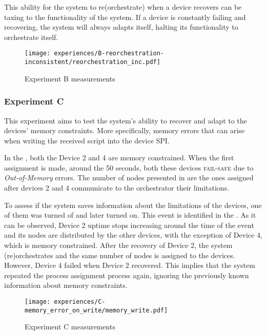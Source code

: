 This ability for the system to re(orchestrate) when a device recovers can be taxing to the functionality of the system. If a device is constantly failing and recovering, the system will always adapts itself, halting its functionality to orchestrate itself.

\begin{figure}[h]
\centering
\texttt{[image: experiences/B-reorchestration-inconsistent/reorchestration\_inc.pdf]}
\caption[Experiment B measurements]{Experiment B measurements}\label{fig:experiment_b_graph}
\end{figure}


\subsubsection{Experiment C}

This experiment aims to test the system's ability to recover and adapt to the devices' memory constraints. More specifically, memory errors that can arise when writing the received script into the device SPI.

In the , both the Device 2 and 4 are memory constrained. When the first assignment is made, around the 50 seconds, both these devices \textsc{fail-safe} due to \textit{Out-of-Memory} errors. The number of nodes presented in  are the ones assigned after devices 2 and 4 communicate to the orchestrator their limitations. 

To assess if the system saves information about the limitations of the devices, one of them was turned of and later turned on. This event is identified in the . As it can be observed, Device 2 uptime stops increasing around the time of the event and its nodes are distributed by the other devices, with the exception of Device 4, which is memory constrained. 
After the recovery of Device 2, the system (re)orchestrates and the same number of nodes is assigned to the devices. However, Device 4 failed when Device 2 recovered. This implies that the system repeated the process assignment process again, ignoring the previously known information about memory constraints.

\begin{figure}[h]
\centering
\texttt{[image: experiences/C-memory\_error\_on\_write/memory\_write.pdf]}
\caption[Experiment C measurements]{Experiment C measurements}\label{fig:experiment_c_graph}
\end{figure}

